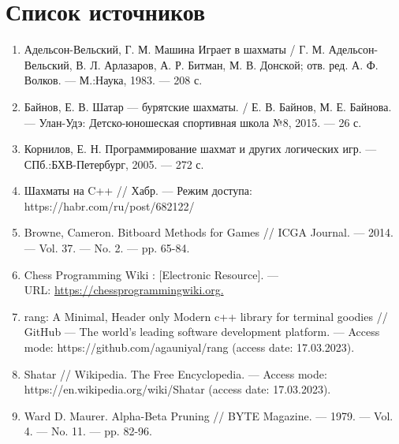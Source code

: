 {
	\chapter*{Список источников}
	\begin{enumerate}
		\item Адельсон-Вельский, Г. М. Машина Играет в шахматы / Г. М. Адельсон-Вельский, В. Л. Арлазаров, А. Р. Битман, М. В. Донской; отв. ред. А. Ф. Волков. --- М.:Наука, 1983. --- 208 с.
		\item Байнов, Е. В. Шатар --- бурятские шахматы. / Е. В. Байнов, М. Е. Байнова. --- Улан-Удэ: Детско-юношеская спортивная школа №8, 2015. --- 26 с.
		\item Корнилов, Е. Н. Программирование шахмат и других логических игр. --- СПб.:БХВ-Петербург, 2005. --- 272 с. 
		\item Шахматы на C++ // Хабр. --- Режим доступа: \\ https://habr.com/ru/post/682122/
		\item Browne, Cameron. Bitboard Methods for Games // ICGA Journal. --- 2014. --- Vol. 37. --- No. 2. --- pp. 65-84.
		\item Chess Programming Wiki : [Electronic Resource]. --- \\URL: \href{https://chessprogrammingwiki.org}{https://chessprogrammingwiki.org.}
		\item rang: A Minimal, Header only Modern c++ library for terminal goodies // GitHub --- The world’s leading software development platform. --- Access mode: https://github.com/agauniyal/rang
		(access date: 17.03.2023).
		\item Shatar // Wikipedia. The Free Encyclopedia. --- Access mode: \\ https://en.wikipedia.org/wiki/Shatar
		(access date: 17.03.2023).
		\item Ward D. Maurer. Alpha-Beta Pruning // BYTE Magazine. --- 1979. --- Vol. 4. --- No. 11. --- pp. 82-96.
	\end{enumerate}
	\clearpage
}